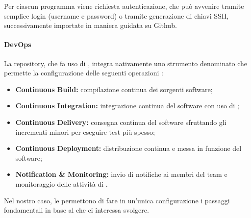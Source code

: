 	Per ciascun programma viene richiesta autenticazione, che può avvenire tramite semplice login (username e password) o tramite generazione di chiavi SSH, successivamente importate in maniera guidata su Github.

	\paragraph{DevOps}

	La repository, che fa uso di , integra nativamente uno strumento denominato  che permette la configurazione delle seguenti operazioni :
	\begin{itemize}
		\item \textbf{Continuous Build:} compilazione continua dei sorgenti software;
		\item \textbf{Continuous Integration:} integrazione continua del software con uso di ;
		\item \textbf{Continuous Delivery:} consegna continua del software sfruttando gli incrementi minori per eseguire test più spesso;
		\item \textbf{Continuous Deployment:} distribuzione continua e messa in funzione del software;
		\item \textbf{Notification \& Monitoring:} invio di notifiche ai membri del team e monitoraggio delle attività di .
	\end{itemize}

	Nel nostro caso, le  permettono di fare in un'unica configurazione i passaggi fondamentali in base al  che ci interessa svolgere. 






